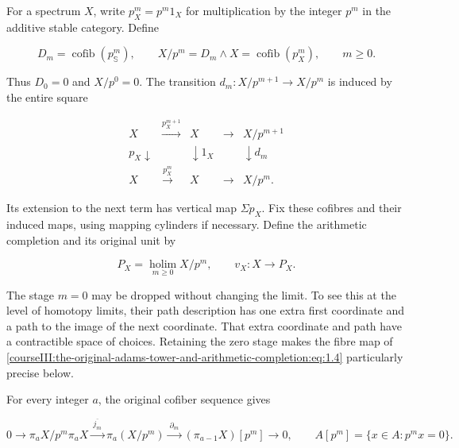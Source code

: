 For a spectrum \(X\), write \(p^m_X=p^m1_X\) for multiplication by the integer \(p^m\) in the additive stable category. Define

\begin{equation}
D_m=\operatorname{cofib}(p^m_{\mathbb S}),\qquad
X/p^m=D_m\wedge X=\operatorname{cofib}(p^m_X),\qquad m\geq0.
\label{courseIII:the-original-adams-tower-and-arithmetic-completion:eq:1.2}
\end{equation}

Thus \(D_0=0\) and \(X/p^0=0\). The transition \(d_m:X/p^{m+1}\to X/p^m\) is induced by the entire square

\begin{equation}
\begin{array}{ccccc}
X&\xrightarrow{p^{m+1}_X}&X&\longrightarrow&X/p^{m+1}\\
{\scriptstyle p_X}\downarrow&&\downarrow{\scriptstyle1_X}&&\downarrow{\scriptstyle d_m}\\
X&\xrightarrow{p^m_X}&X&\longrightarrow&X/p^m .
\end{array}
\label{courseIII:the-original-adams-tower-and-arithmetic-completion:eq:1.3}
\end{equation}

Its extension to the next term has vertical map \(\Sigma p_X\). Fix these cofibres and their induced maps, using mapping cylinders if necessary. Define the arithmetic completion and its original unit by

\begin{equation}
P_X=\operatorname*{holim}_{m\geq0}X/p^m,
\qquad v_X:X\longrightarrow P_X.
\label{courseIII:the-original-adams-tower-and-arithmetic-completion:eq:1.4}
\end{equation}

The stage \(m=0\) may be dropped without changing the limit. To see this at the level of homotopy limits, their path description has one extra first coordinate and a path to the image of the next coordinate. That extra coordinate and path have a contractible space of choices. Retaining the zero stage makes the fibre map of \eqref{courseIII:the-original-adams-tower-and-arithmetic-completion:eq:1.4} particularly precise below.

For every integer \(a\), the original cofiber sequence gives

\begin{equation}
0\longrightarrow \pi_aX/p^m\pi_aX
\xrightarrow{\ \overline{j_m}\ }\pi_a(X/p^m)
\xrightarrow{\ \partial_m\ }(\pi_{a-1}X)[p^m]
\longrightarrow0,
\qquad A[p^m]=\{x\in A:p^mx=0\}.
\label{courseIII:the-original-adams-tower-and-arithmetic-completion:eq:1.5}
\end{equation}

